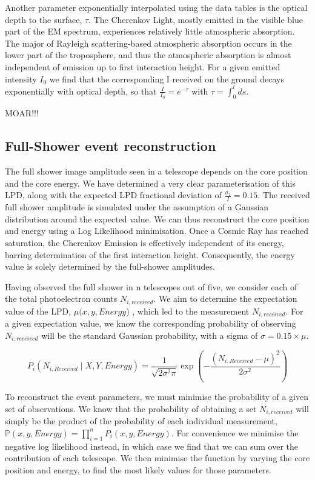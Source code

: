 \documentclass{article}
\begin{document}
Another parameter exponentially interpolated using the data tables is the optical depth to the surface, $\tau$. The Cherenkov Light, mostly emitted in the visible blue part of the EM spectrum, experiences relatively little atmospheric absorption. The major of Rayleigh scattering-based atmospheric absorption occurs in the lower part of the troposphere, and thus the atmospheric absorption is almost independent of emission up to first interaction height. For a given emitted intensity $I_{0}$ we find that the corresponding I received on the ground decays exponentially with optical depth, so that $\frac{I}{I_{0}}=e^{-\tau}$ with $\tau=\int_{0}^{l}ds$. 

MOAR!!!

\subsection{Full-Shower event reconstruction}
The full shower image amplitude seen in a telescope depends on the core position and the core energy. We have determined a very clear parameterisation of this LPD, along with the expected LPD fractional deviation of $\frac{\sigma_{I}}{I}= 0.15$. The received full shower amplitude is simulated under the assumption of a Gaussian distribution around the expected value. We can thus reconstruct the core position and energy using a Log Likelihood minimisation. Once a Cosmic Ray has reached saturation, the Cherenkov Emission is effectively independent of its energy, barring determination of the first interaction height. Consequently, the energy value is solely determined by the full-shower amplitudes. 

Having observed the full shower in n telescopes out of five, we consider each of the total photoelectron counts $N_{i, received}$. We aim to determine the expectation value of the LPD, $\mu(x, y, Energy$) , which led to the measurement $N_{i, received}$. For a given expectation value, we know the corresponding probability of observing $N_{i, received}$ will be the standard Gaussian probability, with a sigma of $\sigma = 0.15 \times \mu$.

\[  P_{i} ( N_{i, Received} \mid X, Y, Energy )  =  \frac{1}{\sqrt{2 \sigma^{2} \pi}} \exp(-\frac{(N_{i, Received} - \mu)^{2}}{2 \sigma^{2}}) \]

To reconstruct the event parameters, we must minimise the probability of a given set of observations. We know that the probability of obtaining a set $N_{i,received}$ will simply be the product of the probability of each individual measurement, $\mathbb{P}(x, y, Energy) = \prod_{i=1}^{n} P_{i}(x, y, Energy)$. For convenience we minimise the negative log likelihood instead, in which case we find that we can sum over the contribution of each telescope. We then minimise the function by varying the core position and energy, to find the most likely values for those parameters.
\end{document}
